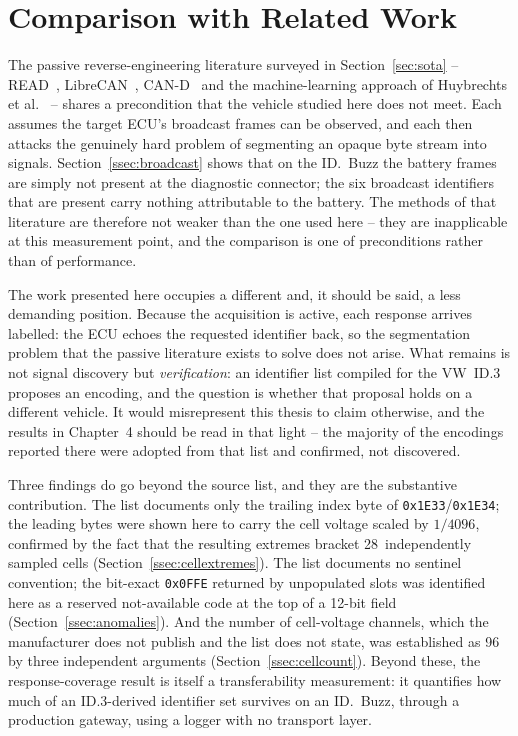 \documentclass[11pt,a4paper,oneside,parskip=half]{scrreprt}
\providecommand{\hex}{}\renewcommand{\hex}[1]{\texttt{0x#1}}
\begin{document}
\section{Comparison with Related Work}
The passive reverse-engineering literature surveyed in Section~\ref{sec:sota} -- READ~\cite{read}, LibreCAN~\cite{librecan}, CAN-D~\cite{cand} and the machine-learning approach of Huybrechts et al.~\cite{huybrechts2018automatic} -- shares a precondition that the vehicle studied here does not meet. Each assumes the target ECU's broadcast frames can be observed, and each then attacks the genuinely hard problem of segmenting an opaque byte stream into signals. Section~\ref{ssec:broadcast} shows that on the ID.~Buzz the battery frames are simply not present at the diagnostic connector; the six broadcast identifiers that are present carry nothing attributable to the battery. The methods of that literature are therefore not weaker than the one used here -- they are inapplicable at this measurement point, and the comparison is one of preconditions rather than of performance.

The work presented here occupies a different and, it should be said, a less demanding position. Because the acquisition is active, each response arrives labelled: the ECU echoes the requested identifier back, so the segmentation problem that the passive literature exists to solve does not arise. What remains is not signal discovery but \emph{verification}: an identifier list compiled for the VW~ID.3~\cite{vwmebpidlist} proposes an encoding, and the question is whether that proposal holds on a different vehicle. It would misrepresent this thesis to claim otherwise, and the results in Chapter~4 should be read in that light -- the majority of the encodings reported there were adopted from that list and confirmed, not discovered.

Three findings do go beyond the source list, and they are the substantive contribution. The list documents only the trailing index byte of \hex{1E33}/\hex{1E34}; the leading bytes were shown here to carry the cell voltage scaled by $1/4096$, confirmed by the fact that the resulting extremes bracket 28~independently sampled cells (Section~\ref{ssec:cellextremes}). The list documents no sentinel convention; the bit-exact \hex{0FFE} returned by unpopulated slots was identified here as a reserved not-available code at the top of a 12-bit field (Section~\ref{ssec:anomalies}). And the number of cell-voltage channels, which the manufacturer does not publish and the list does not state, was established as 96 by three independent arguments (Section~\ref{ssec:cellcount}). Beyond these, the response-coverage result is itself a transferability measurement: it quantifies how much of an ID.3-derived identifier set survives on an ID.~Buzz, through a production gateway, using a logger with no transport layer.
\end{document}
